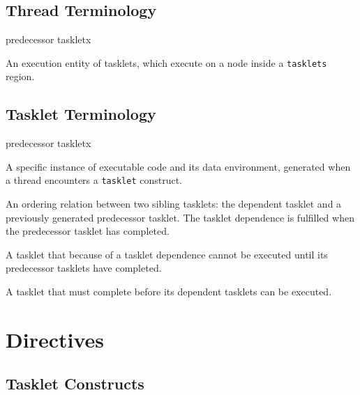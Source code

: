 \subsection{Thread Terminology}

\begin{namelist}{predecessor taskletx}


  An execution entity of tasklets, which execute on a node inside a
  \verb|tasklets| region.

\end{namelist}

\subsection{Tasklet Terminology}

\begin{namelist}{predecessor taskletx}


  A specific instance of executable code and its data environment,
  generated when a thread encounters a \verb|tasklet| construct.


  An ordering relation between two sibling tasklets: the dependent
  tasklet and a previously generated predecessor tasklet. The tasklet
  dependence is fulfilled when the predecessor tasklet has completed.


  A tasklet that because of a tasklet dependence cannot be executed
  until its predecessor tasklets have completed.


  A tasklet that must complete before its dependent tasklets can be
  executed.

\end{namelist}


\section{Directives}

\subsection{Tasklet Constructs}

%
%

